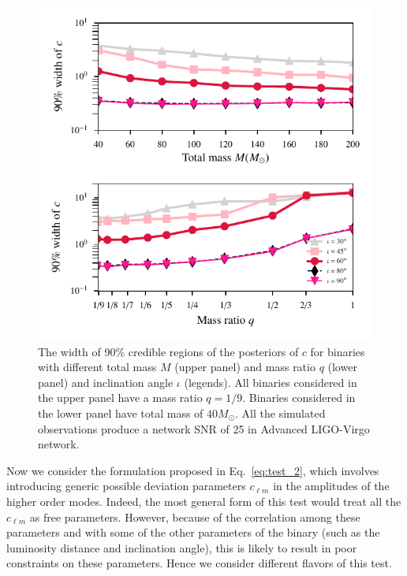 \documentclass[prd,preprintnumbers,twocolumn,eqsecnum,floatfix,a4paper,nofootinbib,superscriptaddress]{revtex4}
\begin{document}
\begin{figure}[h]
	\begin{center}
		\includegraphics[scale=0.85]{figs/90_percent_CI_c1.pdf}
	\end{center} 
	\caption{The width of 90\% credible regions of the posteriors of $c$ for binaries with different total mass $M$ (upper panel) and mass ratio $q$ (lower panel) and inclination angle $\iota$ (legends). All binaries considered in the upper panel have a mass ratio $q=1/9$. Binaries considered in the lower panel have total mass of $40M_{\odot}$. All the simulated observations produce a network SNR of 25 in Advanced LIGO-Virgo network.}
	\label{fig:constraint_c}
\end{figure}



Now we consider the formulation proposed in Eq.~\eqref{eq:test_2}, which involves introducing generic possible deviation parameters $c_{\ell m}$ in the amplitudes of the higher order modes. Indeed, the most general form of this test would treat all the $c_{\ell m}$ as free parameters. However, because of the correlation among these parameters and with some of the other parameters of the binary (such as the luminosity distance and inclination angle), this is likely to result in poor constraints on these parameters. Hence we consider different flavors of this test. 
\end{document}
